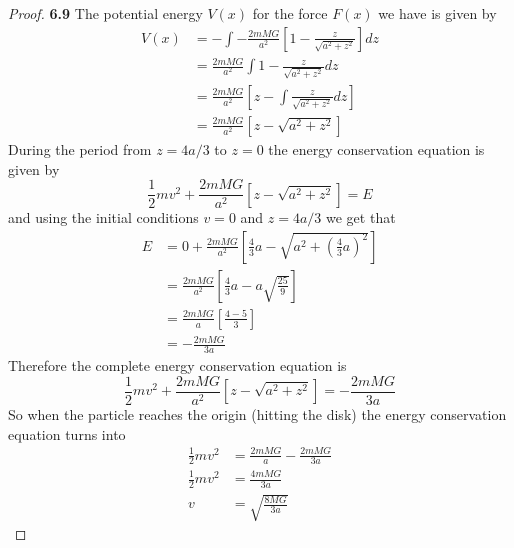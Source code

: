 \documentclass[11pt]{article}
\theoremstyle{definition}
\begin{document}
    \begin{proof}{\textbf{6.9}}
        The potential energy $V(x)$ for the force $F(x)$ we have is given by
        \begin{align*}
            V(x) &= - \int - \frac{2mMG}{a^2}\left[1 - \frac{z}{\sqrt{a^2 + z^2}}\right] dz\\
                 &= \frac{2mMG}{a^2} \int 1 - \frac{z}{\sqrt{a^2 + z^2}} dz\\
                 &= \frac{2mMG}{a^2} \left[z - \int \frac{z}{\sqrt{a^2 + z^2}} dz\right]\\
                 &= \frac{2mMG}{a^2} \left[z - \sqrt{a^2+z^2}\right]
        \end{align*}
        During the period from $z=4a/3$ to $z=0$ the energy conservation equation is
        given by
        $$\frac{1}{2}mv^2 + \frac{2mMG}{a^2} \left[z - \sqrt{a^2+z^2}\right] = E$$
        and using the initial conditions $v=0$ and $z=4a/3$ we get that
        \begin{align*}
            E &= 0 + \frac{2mMG}{a^2} \left[\frac{4}{3}a - \sqrt{a^2+(\frac{4}{3}a)^2}\right]\\
              &= \frac{2mMG}{a^2} \left[\frac{4}{3}a - a\sqrt{\frac{25}{9}}\right]\\
              &= \frac{2mMG}{a}\left[\frac{4-5}{3}\right]\\
              &= -\frac{2mMG}{3a}
        \end{align*}
        Therefore the complete energy conservation equation is
        $$\frac{1}{2}mv^2 + \frac{2mMG}{a^2} \left[z - \sqrt{a^2+z^2}\right] = -\frac{2mMG}{3a}$$
        So when the particle reaches the origin (hitting the disk) the energy
        conservation equation turns into
        \begin{align*}
            \frac{1}{2}mv^2 &= \frac{2mMG}{a} - \frac{2mMG}{3a}\\
            \frac{1}{2}mv^2 &= \frac{4mMG}{3a}\\
                          v &= \sqrt{\frac{8MG}{3a}}
        \end{align*}
    \end{proof} 
\end{document}

